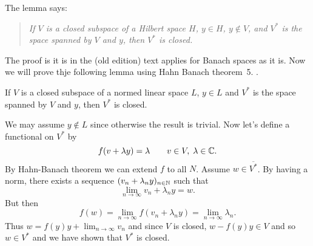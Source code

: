 \begin{enumerate}
The lemma says:
\begin{quote}
\textsl{
If $V$ is a closed subspace of a Hilbert space $H$,
\(y\in H\),
\(y\notin V\),
and \(V^{*}\) is the space spanned by $V$ and $y$, then 
\(V^{*}\) is closed.
}
\end{quote}

The proof is it is in the (old edition) text applies for Banach spaces
as it is. Now we will prove thje following lemma using 
Hahn Banach
theorem~5. \cite{}.

\begin{llem}
If $V$ is a closed subspace of a normed linear space $L$,
\(y\in L\)
and \(V^{*}\) is the space spanned by $V$ and $y$, then 
\(V^{*}\) is closed.
\end{llem}

\begin{thmproof}
We may assume \(y\notin L\) since otherwise the result is trivial.
Now let's define a functional on \(V^{*}\) by
\[ f(v + \lambda y) = \lambda \qquad v\in V,\; \lambda \in\mathbb{C}.\]
By Hahn-Banach theorem we can extend $f$ to all $N$.
Assume \(w\in \overline{V^*}\).
By having a norm, there exists a sequence \((v_n + \lambda_n y)_{n\in\mathbb{N}}\)
such that 
\[\lim_{n\to\infty} v_n + \lambda_n y = w.\]
But then 
\[f(w) = \lim_{n\to\infty} f(v_n + \lambda_n y) 
       = \lim_{n\to\infty} \lambda_n.\] 
Thus \(w = f(y)y + \lim_{n\to\infty} v_n\) and 
since $V$ is closed,
\(w - f(y)y\in V\) and so \(w\in V^*\) and we have shown that \(V^*\) is 
closed.
\end{thmproof}




\end{enumerate}

